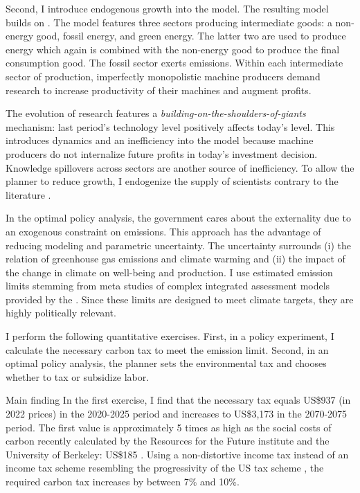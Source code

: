 Second, I introduce endogenous growth into the model. The resulting model builds on \cite{Fried2018ClimateAnalysis}. The model features three sectors producing intermediate goods:  a non-energy good, fossil energy, and green energy. The latter two are used to produce energy which again is combined with the non-energy good to produce the final consumption good. The fossil sector exerts emissions. Within each intermediate sector of production, imperfectly monopolistic machine producers demand research to increase productivity of their machines and augment profits.

The evolution of research features a \textit{building-on-the-shoulders-of-giants} mechanism: last period's technology level positively affects today's level. This introduces dynamics and an inefficiency into the model because machine producers do not internalize future profits in today's investment decision. Knowledge spillovers across sectors are another source of inefficiency. To allow the planner to reduce growth, I endogenize the supply of scientists contrary to the literature \citep{Acemoglu2012TheChange, Fried2018ClimateAnalysis}. 

In the optimal policy analysis, the government cares about the externality due to an exogenous constraint on emissions. This approach has the advantage of reducing modeling and parametric uncertainty. The uncertainty surrounds (i) the relation of greenhouse gas emissions and climate warming and (ii) the impact of the change in climate on well-being and production. I use estimated emission limits stemming from meta studies of complex integrated assessment models provided by the \cite{IPCC2022}. Since these limits are designed to meet climate targets, they are highly politically relevant.  

I perform the following quantitative exercises. First, in a policy experiment, I calculate the necessary carbon tax to meet the emission limit. Second, in an optimal policy analysis, the planner sets the environmental tax and chooses whether to tax or subsidize labor.



Main finding
In the first exercise, I find that the necessary tax equals US\$937 (in 2022 prices) in the 2020-2025 period and increases to US\$3,173 in the 2070-2075 period. The first value is approximately 5 times as high as the social costs of carbon recently calculated by the Resources for the Future institute and the University of Berkeley: US\$185 \citep{RFF}. Using a non-distortive income tax instead of an income tax scheme resembling the progressivity of the US tax scheme \citep[taken from][]{Heathcote2017OptimalFramework},  the required carbon tax increases by between 7\% and 10\%. 



